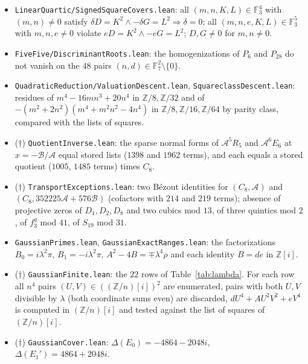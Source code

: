 \documentclass[10pt]{article}
\theoremstyle{definition}
\theoremstyle{remark}
\newcommand{\Z}{\mathbb{Z}}
\newcommand{\F}{\mathbb{F}}
\newcommand{\lam}{\lambda}
\newcommand{\pisym}{\pi}
\newcommand{\rhosym}{\rho}
\begin{document}
\begin{itemize}
\item \texttt{Linear\allowbreak Quartic/\allowbreak Signed\allowbreak Square\allowbreak Covers.\allowbreak lean}: all $(m,n,K,L)\in\F_3^4$
with $(m,n)\ne0$ satisfy $\delta D=K^2\wedge-\delta G=L^2\Rightarrow\delta=0$;
all $(m,n,e,K,L)\in\F_3^5$ with $m,n,e\ne0$ violate $eD=K^2\wedge-eG=L^2$;
$D,G\ne0$ for $m,n\ne0$.
\item \texttt{Five\allowbreak Five/\allowbreak Discriminant\allowbreak Roots.\allowbreak lean}: the homogenizations of $P_6$
and $P_{28}$ do not vanish on the $48$ pairs $(n,d)\in\F_7^2\setminus\{0\}$.
\item \texttt{Quadratic\allowbreak Reduction/\allowbreak Valuation\allowbreak Descent.\allowbreak lean}, \texttt{Squareclass\allowbreak Descent.\allowbreak lean}:
residues of $m^4-16mn^3+20n^4$ in $\Z/8,\Z/32$ and of
$-(m^2+2n^2)(m^4+m^2n^2-4n^4)$ in $\Z/8,\Z/16,\Z/64$ by parity class, compared
with the lists of squares.
\item ($\dagger$) \texttt{Quotient\allowbreak Inverse.\allowbreak lean}: the sparse normal forms of
$\mathcal{A}^5R_5$ and $\mathcal{A}^6E_6$ at $x=-\mathcal{B}/\mathcal{A}$ equal
stored lists ($1398$ and $1962$ terms), and each equals a stored quotient
($1005$, $1485$ terms) times $C_8$.
\item ($\dagger$) \texttt{Transport\allowbreak Exceptions.\allowbreak lean}: two B\'ezout identities
for $(C_8,\mathcal{A})$ and $(C_8,352225\mathcal{A}+576\mathcal{B})$ (cofactors
with $214$ and $219$ terms); absence of projective zeros of $D_1,D_2,D_8$ and
two cubics mod $13$, of three quintics mod $2$, of $f_3^y$ mod $41$, of
$S_{19}$ mod $31$.
\item \texttt{Gaussian\allowbreak Primes.\allowbreak lean}, \texttt{Gaussian\allowbreak Exact\allowbreak Ranges.\allowbreak lean}:
the factorizations $B_0=i\lam^2\pisym$, $B_1=-i\lam^2\pisym$,
$A^2-4B=\mp\lam^4\rhosym$ and each identity $B=de$ in $\Z[i]$.
\item ($\dagger$) \texttt{Gaussian\allowbreak Finite.\allowbreak lean}: the $22$ rows of
Table~\ref{tab:lambda}.  For each row all $n^4$ pairs $(U,V)\in((\Z/n)[i])^2$
are enumerated, pairs with both $U,V$ divisible by $\lam$ (both coordinate
sums even) are discarded, $dU^4+AU^2V^2+eV^4$ is computed in $(\Z/n)[i]$ and
tested against the list of squares of $(\Z/n)[i]$.
\item ($\dagger$) \texttt{Gaussian\allowbreak Cover.\allowbreak lean}: $\Delta(E_0)=-4864-2048i$,
$\Delta(E_1')=4864+2048i$.

\end{itemize}
\end{document}
